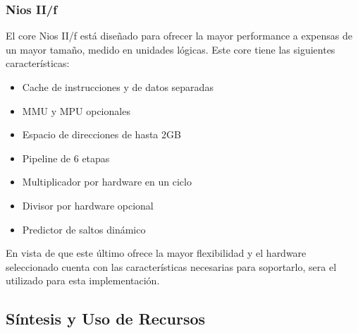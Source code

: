 \subsubsection{Nios II/f}
El core Nios II/f está diseñado para ofrecer la mayor performance a expensas de un mayor tamaño, medido en unidades lógicas. Este core tiene las siguientes características:

\begin{itemize}
	\item Cache de instrucciones y de datos separadas
	\item MMU y MPU opcionales
	\item Espacio de direcciones de hasta 2GB
	\item Pipeline de 6 etapas
	\item Multiplicador por hardware en un ciclo
	\item Divisor por hardware opcional
	\item Predictor de saltos dinámico
\end{itemize}

En vista de que este último ofrece la mayor flexibilidad y el hardware seleccionado cuenta con las características necesarias para soportarlo, sera el utilizado para esta implementación. 


\subsection{Síntesis y Uso de Recursos}

